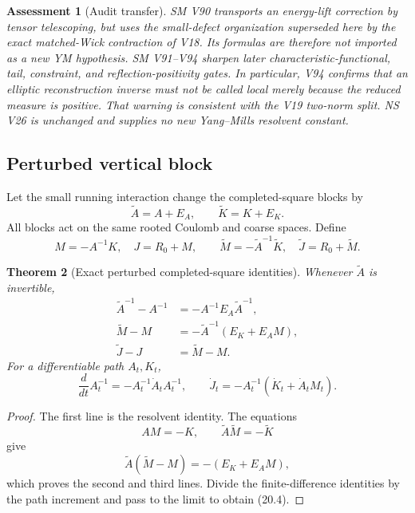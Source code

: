 \documentclass[11pt,oneside]{book}
\newtheorem{theorem}{Theorem}[chapter]
\newtheorem{assessment}[theorem]{Assessment}
\theoremstyle{definition}
\theoremstyle{remark}
\begin{document}
\begin{assessment}[Audit transfer]
\label{ass:e8v20-transfer}
SM V90 transports an energy-lift correction by tensor telescoping, but
uses the small-defect organization superseded here by the exact
matched-Wick contraction of V18.  Its formulas are therefore not
imported as a new YM hypothesis.  SM V91--V94 sharpen later
characteristic-functional, tail, constraint, and reflection-positivity
gates.  In particular, V94 confirms that an elliptic reconstruction
inverse must not be called local merely because the reduced measure is
positive.  That warning is consistent with the V19 two-norm split.
NS V26 is unchanged and supplies no new Yang--Mills resolvent constant.
\end{assessment}

\subsection{Perturbed vertical block}

Let the small running interaction change the completed-square blocks by
\[
 \widetilde A=A+E_A,\qquad
 \widetilde K=K+E_K.                                \tag{20.1}
\]
All blocks act on the same rooted Coulomb and coarse spaces.  Define
\[
 M=-A^{-1}K,\quad J=R_0+M,\qquad
 \widetilde M=-\widetilde A^{-1}\widetilde K,\quad
 \widetilde J=R_0+\widetilde M.                     \tag{20.2}
\]

\begin{theorem}[Exact perturbed completed-square identities]
\label{thm:e8v20-resolvent}
Whenever \(\widetilde A\) is invertible,
\[
\boxed{
\begin{aligned}
\widetilde A^{-1}-A^{-1}
 &=-A^{-1}E_A\widetilde A^{-1},\\
\widetilde M-M
 &=-\widetilde A^{-1}(E_K+E_AM),\\
\widetilde J-J&=\widetilde M-M.
\end{aligned}}                                                     \tag{20.3}
\]
For a differentiable path \(A_t,K_t\),
\[
\boxed{
\frac d{dt}A_t^{-1}=-A_t^{-1}\dot A_tA_t^{-1},\qquad
\dot J_t=-A_t^{-1}(\dot K_t+\dot A_tM_t).}          \tag{20.4}
\]
\end{theorem}

\begin{proof}
The first line is the resolvent identity.  The equations
\[
 AM=-K,\qquad \widetilde A\widetilde M=-\widetilde K
\]
give
\[
 \widetilde A(\widetilde M-M)=-(E_K+E_AM),
\]
which proves the second and third lines.  Divide the finite-difference
identities by the path increment and pass to the limit to obtain
(20.4).
\end{proof}
\end{document}
